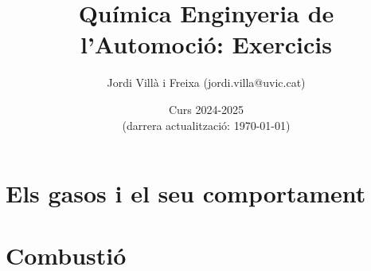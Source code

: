 \documentclass[12pt]{article}
\title{Química Enginyeria de l'Automoció: Exercicis}
\date{Curs 2024-2025\\\small{(darrera actualització: \today)}}
\author{Jordi Vill\`a i Freixa (jordi.villa@uvic.cat)}
\begin{document}
\maketitle
\tableofcontents
\section{Els gasos i el seu comportament}


\section{Combustió}

% 
% 
% 
% 
% 
\printbibliography
\end{document}
